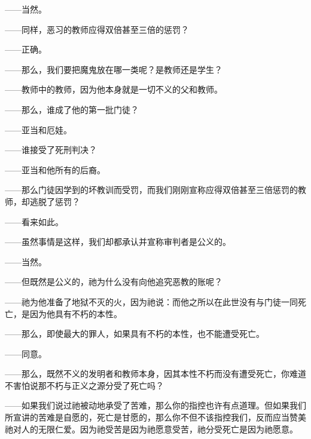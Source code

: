 ——当然。\par

——同样，恶习的教师应得双倍甚至三倍的惩罚？\par

——正确。\par

——那么，我们要把魔鬼放在哪一类呢？是教师还是学生？\par

——教师中的教师，因为他本身就是一切不义的父和教师。\par

——那么，谁成了他的第一批门徒？\par

——亚当和厄娃。\par

——谁接受了死刑判决？\par

——亚当和他所有的后裔。\par

——那么门徒因学到的坏教训而受罚，而我们刚刚宣称应得双倍甚至三倍惩罚的教师，却逃脱了惩罚？\par

——看来如此。\par

——虽然事情是这样，我们却都承认并宣称审判者是公义的。\par

——当然。\par

——但既然是公义的，祂为什么没有向他追究恶教的账呢？\par

——祂为他准备了地狱不灭的火，因为祂说：而他之所以在此世没有与门徒一同死亡，是因为他具有不朽的本性。\par

——那么，即使最大的罪人，如果具有不朽的本性，也不能遭受死亡。\par

——同意。\par

——那么，既然不义的发明者和教师本身，因其本性不朽而没有遭受死亡，你难道不害怕说那不朽与正义之源分受了死亡吗？\par

——如果我们说过祂被动地承受了苦难，那么你的指控也许有点道理。但如果我们所宣讲的苦难是自愿的，死亡是甘愿的，那么你不但不该指控我们，反而应当赞美祂对人的无限仁爱。因为祂受苦是因为祂愿意受苦，祂分受死亡是因为祂愿意。\par

